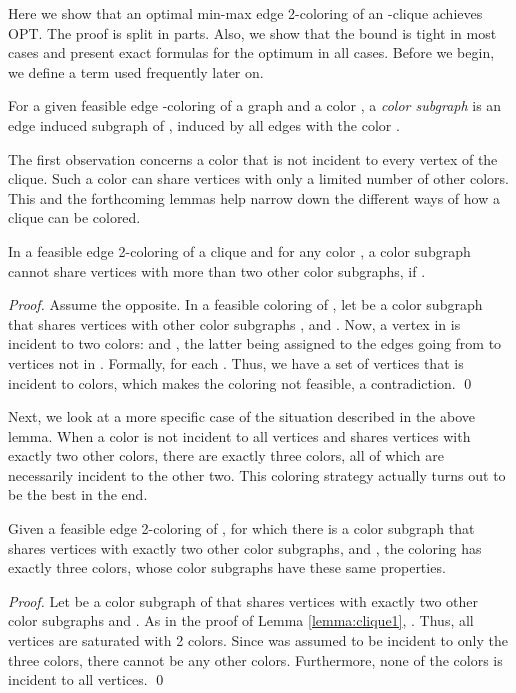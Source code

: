 \documentclass[runningheads, a4paper]{llncs}
\begin{document}
Here we show that an optimal min-max edge 2-coloring of an -clique  achieves OPT. The proof is split in parts. Also, we show that the bound is tight in most cases and present exact formulas for the optimum in all cases. Before we begin, we define a term used frequently later on.



\begin{definition}\label{def:color-subgraph}
For a given feasible edge -coloring of a graph  and a color , a \textit{color subgraph}  is an edge induced subgraph of , induced by all edges with the color .
\end{definition}

The first observation concerns a color that is not incident to every vertex of the clique. Such a color can share vertices with only a limited number of other colors. This and the forthcoming lemmas help narrow down the different ways of how a clique can be colored. 

\begin{lemma}\label{lemma:clique1}
In a feasible edge 2-coloring of a clique  and for any color , a color subgraph  cannot share vertices with more than two other color subgraphs, if .
\end{lemma}
\begin{proof}
Assume the opposite. In a feasible coloring of , let  be a color subgraph that shares vertices with  other color subgraphs , and . Now, a vertex  in  is incident to two colors:  and , the latter being assigned to the edges going from  to vertices not in .  Formally,  for each . Thus, we have a set of vertices  that is incident to  colors, which makes the coloring not feasible, a contradiction. \qed
\end{proof}

Next, we look at a more specific case of the situation described in the above lemma. When a color is not incident to all vertices and shares vertices with exactly two other colors, there are exactly three colors, all of which are necessarily incident to the other two. This coloring strategy actually turns out to be the best in the end.

\begin{lemma}\label{lemma:clique2}
Given a feasible edge 2-coloring of , for which there is a color subgraph  that shares vertices with exactly two other color subgraphs, and , the coloring has exactly three colors, whose color subgraphs have these same properties.
\end{lemma}
\begin{proof}
Let  be a color subgraph of  that shares vertices with exactly two other color subgraphs  and . As in the proof of Lemma \ref{lemma:clique1}, . Thus, all vertices  are saturated with 2 colors. Since  was assumed to be incident to only the three colors, there cannot be any other colors. Furthermore, none of the colors is incident to all vertices. \qed
\end{proof}
\end{document}
